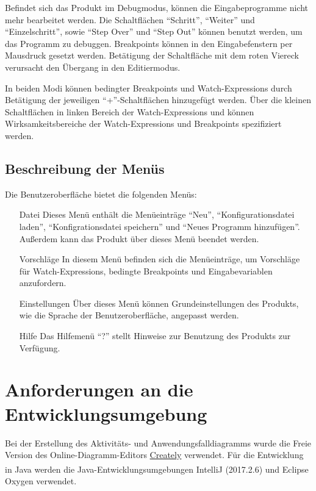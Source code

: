 \documentclass[parskip=full]{scrartcl}
\let\glsplgen\glsuseri
\begin{document}
        Befindet sich das Produkt im \gls{Debugmodus}, können die Eingabeprogramme nicht mehr
        bearbeitet werden.
        Die Schaltflächen \enquote{Schritt}, \enquote{Weiter} und \enquote{Einzelschritt}, sowie \enquote{Step Over} und \enquote{Step Out} können
        benutzt werden, um das Programm zu debuggen. \glspl{Breakpoint} können in den Eingabefenstern per Mausdruck gesetzt werden.
        Betätigung der Schaltfläche mit dem roten Viereck verursacht den Übergang in den Editiermodus.

        In beiden Modi können \glspl{bedingter Breakpoint} und \glspl{Watch-Expression} durch Betätigung der jeweiligen 
        \enquote{+}-Schaltflächen hinzugefügt werden. Über die kleinen Schaltflächen in linken Bereich der \glspl{Watch-Expression} und \glsplgen{bedingter Breakpoint} können Wirksamkeitsbereiche der Watch-Expressions und Breakpoints
        spezifiziert werden.\\
     \subsection{Beschreibung der Menüs}
     Die Benutzeroberfläche bietet die folgenden Menüs:
     \begin{itemize}
     \item[Datei] Dieses Menü enthält die Menüeinträge \enquote{Neu}, \enquote{Konfigurationsdatei laden}, \enquote{Konfigrationsdatei speichern} und \enquote{Neues Programm hinzufügen}. Außerdem kann das Produkt über dieses Menü beendet werden.
     \item[Vorschläge] In diesem Menü befinden sich die Menüeinträge, um Vorschläge für Watch-Expressions, bedingte Breakpoints und Eingabevariablen anzufordern.
     \item[Einstellungen] Über dieses Menü können Grundeinstellungen des Produkts, wie die Sprache der Benutzeroberfläche, angepasst werden.
     \item[Hilfe] Das Hilfemenü \enquote{?} stellt Hinweise zur Benutzung des Produkts zur Verfügung.
     \end{itemize}
       
\section{Anforderungen an die Entwicklungsumgebung}
Bei der Erstellung des Aktivitäts- und Anwendungsfalldiagramms wurde die Freie Version des Online-Diagramm-Editors \href{https://creately.com/}{Creately} verwendet.
Für die Entwicklung in Java werden die Java-Entwicklungsumgebungen IntelliJ\textsuperscript{\textcopyright} (2017.2.6) und Eclipse\textsuperscript{\textcopyright} Oxygen verwendet.
\end{document}
